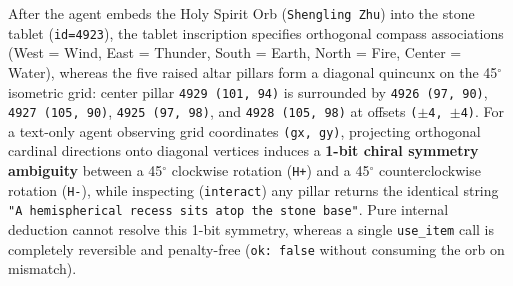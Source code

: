 \documentclass[11pt,a4paper]{article}
\begin{document}
After the agent embeds the Holy Spirit Orb (\texttt{Shengling\allowbreak{} \allowbreak{}Zhu}) into the stone tablet (\texttt{id\allowbreak{}=\allowbreak{}4923}), the tablet inscription specifies orthogonal compass associations (West = Wind, East = Thunder, South = Earth, North = Fire, Center = Water), whereas the five raised altar pillars form a diagonal quincunx on the 45\ensuremath{^\circ} isometric grid: center pillar \texttt{4929\allowbreak{} \allowbreak{}(101\allowbreak{},\allowbreak{} \allowbreak{}94)} is surrounded by \texttt{4926\allowbreak{} \allowbreak{}(97\allowbreak{},\allowbreak{} \allowbreak{}90)}, \texttt{4927\allowbreak{} \allowbreak{}(105\allowbreak{},\allowbreak{} \allowbreak{}90)}, \texttt{4925\allowbreak{} \allowbreak{}(97\allowbreak{},\allowbreak{} \allowbreak{}98)}, and \texttt{4928\allowbreak{} \allowbreak{}(105\allowbreak{},\allowbreak{} \allowbreak{}98)} at offsets \texttt{(\ensuremath{\pm}4\allowbreak{},\allowbreak{} \allowbreak{}\ensuremath{\pm}4)}. For a text-only agent observing grid coordinates \texttt{(gx\allowbreak{},\allowbreak{} \allowbreak{}gy)}, projecting orthogonal cardinal directions onto diagonal vertices induces a \textbf{1-bit chiral symmetry ambiguity} between a 45\ensuremath{^\circ} clockwise rotation (\texttt{H+}) and a 45\ensuremath{^\circ} counterclockwise rotation (\texttt{H\allowbreak{}-}), while inspecting (\texttt{interact}) any pillar returns the identical string \texttt{"A\allowbreak{} \allowbreak{}hemisphe\allowbreak{}rical\allowbreak{} \allowbreak{}recess\allowbreak{} \allowbreak{}sits\allowbreak{} \allowbreak{}atop\allowbreak{} \allowbreak{}the\allowbreak{} \allowbreak{}stone\allowbreak{} \allowbreak{}base"}. Pure internal deduction cannot resolve this 1-bit symmetry, whereas a single \texttt{use\allowbreak{}\_\allowbreak{}item} call is completely reversible and penalty-free (\texttt{ok\allowbreak{}:\allowbreak{} \allowbreak{}false} without consuming the orb on mismatch).
\end{document}
